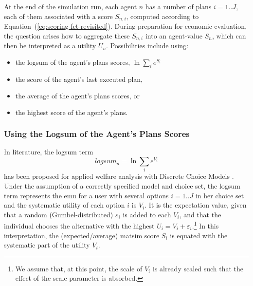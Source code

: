 At the end of the simulation run, each agent $n$ has a number of plans $i=1..J$, each of them associated with a score $S_{n,i}$, computed according to Equation~(\ref{eq:scoring-fct-revisited}).
%
%
During preparation for economic evaluation, the question arises how to aggregate these $S_{n,i}$ into an agent-value $S_n$, which can then be interpreted as a utility $U_n$.  Possibilities include using:
%
%
\begin{itemize}\styleItemize
\item the logsum of the agent's plans scores, \ie $\ln \sum_i e^{S_i}$
\item the score of the agent's last executed plan, 
\item the average of the agent's plans scores, or
\item the highest score of the agent's plans.
\end{itemize}
%

\subsubsection{Using the Logsum of the Agent's Plans Scores}
\label{ch:economicEval:valuingBehavior:output2Eval:logsum}
In literature, the logsum term 
\[
logsum_n = \ln \sum_i e^{V_i}
\]
has been proposed for applied welfare analysis with Discrete Choice Models \citep{SmallRosen1981AppliedWelfareEconomics, deJongDalyEtAl2006logsum, KohliDaly2006LogsumEvalPRISM, deJongEtAl2007LogsumTRA}.
%
%
Under the assumption of a 
  correctly specified model and choice set,
the logsum term represents the \gls{emu} for a user with several options $i=1..J$ in her choice set and the systematic utility of each option $i$ is $V_i$.
%
It is the expectation value, given that a random (Gumbel-distributed) $\varepsilon_i$ is added to each $V_i$, and that the individual chooses the alternative with the highest $U_i = V_i + \varepsilon_i$.\footnote{%
%
We assume that, at this point, the scale of $V_i$ is already scaled such that the effect of the scale parameter is absorbed.
%
} In this interpretation, the 
(expected/average) \acrshort{matsim} score $S_i$ is equated with the systematic part of the utility $V_i$.



